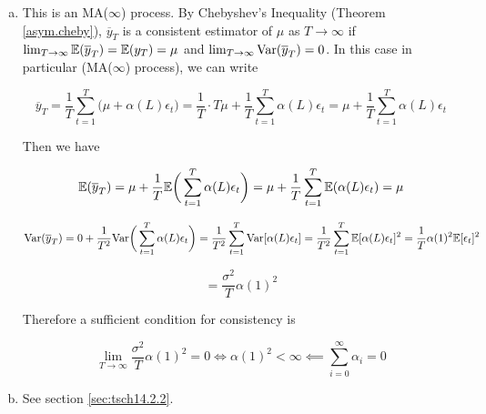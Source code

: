 \begin{enumerate}[(a)]

\item 
This is an MA(\(\infty\)) process. By Chebyshev's Inequality (Theorem \ref{asym.cheby}), \(\overline{y}_T\) is a consistent estimator of \(\mu\) as \(T \to \infty\) if \(\lim_{T \to \infty} \mathbb{E}(\overline{y}_T) = \mathbb{E}(y_T) = \mu\) and \(\lim_{T \to \infty} \mathrm{Var}(\overline{y}_T) = 0\). In this case in particular (MA(\(\infty\)) process), we can write

\[
\overline{y}_T = \frac{1}{T} \sum_{t=1}^T \big( \mu + \alpha(L)\epsilon_t \big) = \frac{1}{T}\cdot T \mu + \frac{1}{T} \sum_{t=1}^T \alpha(L)\epsilon_t = \mu + \frac{1}{T}\sum_{t=1}^T \alpha(L)\epsilon_t 
\]

Then we have

\[
\mathbb{E}(\overline{y}_T) = \mu + \frac{1}{T}\mathbb{E} \bigg( \sum_{t=1}^T \alpha(L)\epsilon_t  \bigg)  = \mu + \frac{1}{T} \sum_{t=1}^T  \mathbb{E} ( \alpha(L)\epsilon_t  ) = \mu
\]

\[
\mathrm{Var}(\overline{y}_T) = 0 + \frac{1}{T^2} \mathrm{Var} \bigg( \sum_{t=1}^T \alpha(L)\epsilon_t  \bigg) = \frac{1}{T^2} \sum_{t=1}^T \mathrm{Var}[ \alpha(L)\epsilon_t ] = \frac{1}{T^2} \sum_{t=1}^T \mathbb{E}[ \alpha(L)\epsilon_t ] ^2 = \frac{1}{T} \alpha(1)^2 \mathbb{E}[\epsilon_t ] ^2
\]

\[
= \frac{\sigma^2}{T} \alpha(1)^2
\]

Therefore a sufficient condition for consistency is 

\[
\lim_{T \to \infty}  \frac{\sigma^2}{T} \alpha(1)^2 = 0 \iff \alpha(1)^2 < \infty \impliedby \boxed{\sum_{i=0}^\infty \alpha_i = 0}
\]

\item See section \ref{sec:tsch14.2.2}.



\end{enumerate}
